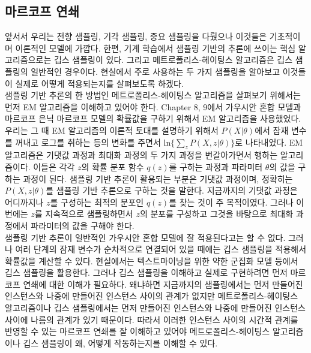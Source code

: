 \documentclass[a4paper]{oblivoir}
\begin{document}
\subsection{마르코프 연쇄}

앞서서 우리는 전향 샘플링, 기각 샘플링, 중요 샘플링을 다뤘으나 이것들은 기초적이며 이론적인 모델에 가깝다. 한편, 기계 학습에서 샘플링 기반의 추론에 쓰이는 핵심 알고리즘으로는 깁스 샘플링이 있다. 그리고 메트로폴리스-헤이팅스 알고리즘은 깁스 샘플링의 일반적인 경우이다. 현실에서 주로 사용하는 두 가지 샘플링을 알아보고 이것들이 실제로 어떻게 적용되는지를 살펴보도록 하겠다. \\

샘플링 기반 추론의 한 방법인 메트로폴리스-헤이팅스 알고리즘을 살펴보기 위해서는 먼저 EM 알고리즘을 이해하고 있어야 한다. Chapter 8, 9에서 가우시안 혼합 모델과 마르코프 은닉 마르코프 모델의 확률값을 구하기 위해서 EM 알고리즘을 사용했었다. 우리는 그 때 EM 알고리즘의 이론적 토대를 설명하기 위해서 $P(X|\theta)$에서 잠재 변수를 꺼내고 로그를 취하는 등의 변화를 주면서 $\textrm{ln} \{ \sum_{z} P(X, z|\theta) \}$로 나타내었다. EM 알고리즘은 기댓값 과정과 최대화 과정의 두 가지 과정을 번갈아가면서 행하는 알고리즘이다. 이들은 각각 $z$의 확률 분포 함수 $q(z)$를 구하는 과정과 파라미터 $\theta$의 값을 구하는 과정이 된다. 샘플링 기반 추론이 활용되는 부분은 기댓값 과정이며, 정확히는 $P(X, z|\theta)$를 샘플링 기반 추론으로 구하는 것을 말한다. 지금까지의 기댓값 과정은 어디까지나 $z$를 구성하는 최적의 분포인 $q(z)$를 찾는 것이 주 목적이였다. 그러나 이번에는 $z$를 지속적으로 샘플링하면서 $z$의 분포를 구성하고 그것을 바탕으로 최대화 과정에서 파라미터의 값을 구해야 한다. \\

샘플링 기반 추론이 일반적인 가우시안 혼합 모델에 잘 적용된다고는 할 수 없다. 그러나 여러 단계의 잠재 변수가 순차적으로 연결되어 있을 때에는 깁스 샘플링을 적용해서 확률값을 계산할 수 있다. 현실에서는 텍스트마이닝을 위한 약한 군집화 모델 등에서 깁스 샘플링을 활용한다. 그러나 깁스 샘플링을 이해하고 실제로 구현하려면 먼저 마르코프 연쇄에 대한 이해가 필요하다. 왜냐하면 지금까지의 샘플링에서는 먼저 만들어진 인스턴스와 나중에 만들어진 인스턴스 사이의 관계가 없지만 메트로폴리스-헤이팅스 알고리즘이나 깁스 샘플링에서는 먼저 만들어진 인스턴스와 나중에 만들어진 인스턴스 사이에 나름의 관계가 있기 때문이다. 따라서 이러한 인스턴스 사이의 시간적 관계를 반영할 수 있는 마르코프 연쇄를 잘 이해하고 있어야 메트로폴리스-헤이팅스 알고리즘이나 깁스 샘플링이 왜, 어떻게 작동하는지를 이해할 수 있다. \\
\end{document}
